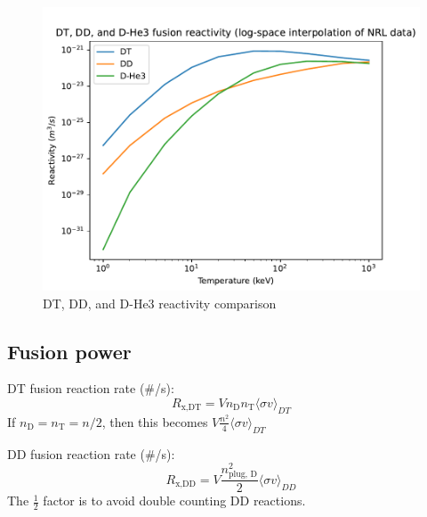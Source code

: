 \begin{figure}
    \centering
    \includegraphics[scale=0.7]{equation_figures/compare_reactivity.pdf}
    \caption{DT, DD, and D-He3 reactivity comparison}
    \label{fig:compare_reac}
\end{figure}

\subsection{Fusion power}

DT fusion reaction rate (\#/s):
\begin{equation}
    R_{\text{x,DT}}= V n_{\text{D}} n_{\text{T}} \langle\sigma v\rangle_{DT}
\end{equation}
If $n_\text{D} = n_\text{T} = n/2$, then this becomes $V \frac{n^2}{4} \langle\sigma v\rangle_{DT}$

DD fusion reaction rate (\#/s):
\begin{equation}
    R_{\text{x,DD}}=V \frac{n_{\text{plug, D}}^2}{2} \langle\sigma v\rangle_{DD}
\end{equation}
The $\frac{1}{2}$ factor is to avoid double counting DD reactions. 

